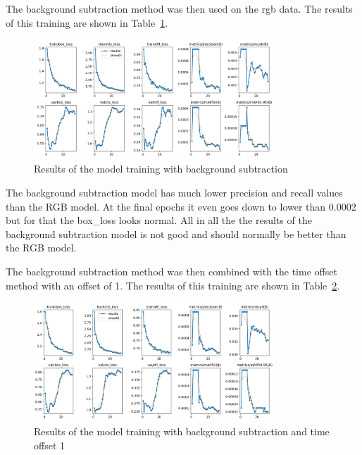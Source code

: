 
The background subtraction method was then used on the rgb data. The results of this training are shown in Table~\ref{fig:results_bgsub}.

\begin{figure}[htbp] 
    \centering
    \includegraphics[width=0.8\textwidth]{images/results/bgsub_results.png}
    \caption{Results of the model training with background subtraction}
    \label{fig:results_bgsub}
\end{figure}

The background subtraction model has much lower precision and recall values than the RGB model. At the final epochs it even goes down to lower than 0.0002 but for that the box\_loss looks normal. All in all the the results of the background subtraction model is not good and should normally be better than the RGB model.


The background subtraction method was then combined with the time offset method with an offset of 1. The results of this training are shown in Table~\ref{fig:results_bgsub_timeoffset1}.

\begin{figure}[htbp] 
    \centering
    \includegraphics[width=0.8\textwidth]{images/results/bgsub_timeoffset1_results.png}
    \caption{Results of the model training with background subtraction and time offset 1}
    \label{fig:results_bgsub_timeoffset1}
\end{figure}

